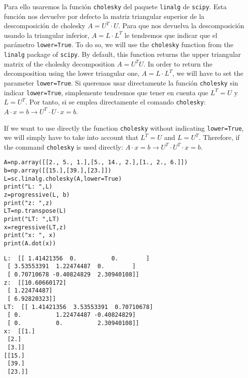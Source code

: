 \begin{paracol}{2}
    Para ello usaremos la función \texttt{cholesky} del paquete \texttt{linalg} de \texttt{scipy}. Esta función nos devuelve por defecto la matriz triangular superior de la descomposición de cholesky $A=U^T\cdot U$. Para que nos devuelva la descomposición usando la triangular inferior, $A=L\cdot L^T$ le tendremos que indicar que el parámetro \texttt{lower=True}.
    \switchcolumn
 To do so, we will use the \texttt{cholesky} function from the \texttt{linalg} package of \texttt{scipy}. By default, this function returns the upper triangular matrix of the cholesky decomposition $A=U^T{U}$. In order to return the decomposition using the lower triangular one, $A=L \cdot L^T$, we will have to set the parameter \texttt{lower=True}.
\switchcolumn
Si queremos usar directamente la función \texttt{cholesky} sin indicar \texttt{lower=True}, simplemente tendremos que tener en cuenta que $L^T = U$ y $L = U^T$. Por tanto, si se emplea directamente el comando \texttt{cholesky}: $A\cdot x = b \rightarrow U^T\cdot U\cdot x= b$.
\switchcolumn

If we want to use directly the function \texttt{cholesky} without indicating \texttt{lower=True}, we will simply have to take into account that $L^T = U$ and $L = U^T$. Therefore, if the command \texttt{cholesky} is used directly: $A \cdot x = b \rightarrow U^T \cdot U^T \cdot x= b$.

\end{paracol}
\begin{verbatim}
A=np.array([[2., 5., 1.],[5., 14., 2.],[1., 2., 6.]])
b=np.array([[15.],[39.],[23.]])
L=sc.linalg.cholesky(A,lower=True)
print("L: ",L)
z=progressive(L, b)
print("z: ",z)
LT=np.transpose(L)
print("LT: ",LT)
x=regressive(LT,z)
print("x: ", x)
print(A.dot(x))
\end{verbatim}

\begin{verbatim}
L:  [[ 1.41421356  0.          0.        ]
 [ 3.53553391  1.22474487  0.        ]
 [ 0.70710678 -0.40824829  2.30940108]]
z:  [[10.60660172]
 [ 1.22474487]
 [ 6.92820323]]
LT:  [[ 1.41421356  3.53553391  0.70710678]
 [ 0.          1.22474487 -0.40824829]
 [ 0.          0.          2.30940108]]
x:  [[1.]
 [2.]
 [3.]]
[[15.]
 [39.]
 [23.]]    
\end{verbatim}

